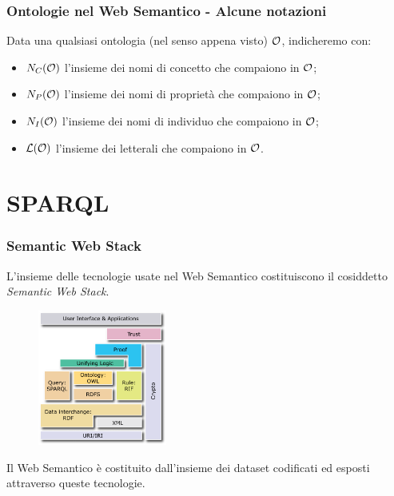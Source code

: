 \documentclass[8pt]{beamer}
\begin{document}
\begin{frame}
\frametitle{Ontologie nel Web Semantico - Alcune notazioni}
Data una qualsiasi ontologia (nel senso appena visto) $\mathcal{O}$, indicheremo con:
\begin{itemize}
 \item $N_C(\mathcal{O})$ l'insieme dei nomi di concetto che compaiono in $\mathcal{O}$;
 \item $N_P(\mathcal{O})$ l'insieme dei nomi di propriet\`a che compaiono in $\mathcal{O}$;
 \item $N_I(\mathcal{O})$ l'insieme dei nomi di individuo che compaiono in $\mathcal{O}$;
 \item $\mathcal{L}(\mathcal{O})$ l'insieme dei letterali che compaiono in $\mathcal{O}$.
\end{itemize}

\end{frame}
\section{SPARQL}


\begin{frame}
 \frametitle{Semantic Web Stack}
 
 L'insieme delle tecnologie usate nel Web Semantico costituiscono il 
 cosiddetto \emph{Semantic Web Stack}.
 
 \begin{figure}
   \includegraphics[width=160px]{Semantic_Web_Stack.png} 
 \end{figure}

 Il Web Semantico \`e costituito dall'insieme dei dataset 
 codificati ed esposti attraverso queste tecnologie.
\end{frame}
\end{document}
